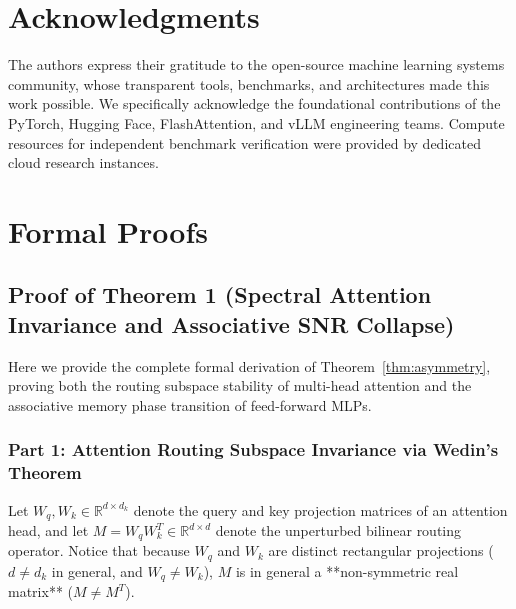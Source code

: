 \documentclass[10pt,twocolumn,letterpaper]{article}
\newcommand{\R}{\mathbb{R}}
\begin{document}
\section*{Acknowledgments}
The authors express their gratitude to the open-source machine learning systems community, whose transparent tools, benchmarks, and architectures made this work possible. We specifically acknowledge the foundational contributions of the PyTorch, Hugging Face, FlashAttention, and vLLM engineering teams. Compute resources for independent benchmark verification were provided by dedicated cloud research instances.




\clearpage
\appendix

\section{Formal Proofs}
\label{app:proofs}

\subsection{Proof of Theorem 1 (Spectral Attention Invariance and Associative SNR Collapse)}
Here we provide the complete formal derivation of Theorem~\ref{thm:asymmetry}, proving both the routing subspace stability of multi-head attention and the associative memory phase transition of feed-forward MLPs.

\subsubsection{Part 1: Attention Routing Subspace Invariance via Wedin's Theorem}
Let $W_q, W_k \in \R^{d \times d_k}$ denote the query and key projection matrices of an attention head, and let $M = W_q W_k^T \in \R^{d \times d}$ denote the unperturbed bilinear routing operator. Notice that because $W_q$ and $W_k$ are distinct rectangular projections ($d \ne d_k$ in general, and $W_q \ne W_k$), $M$ is in general a **non-symmetric real matrix** ($M \ne M^T$).
\end{document}
